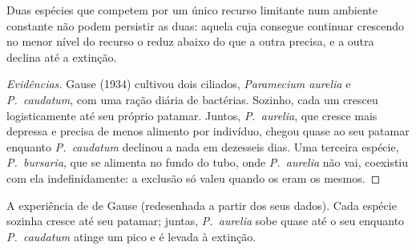 \begin{proposition}\label{prop:b1:species-interactions:gause}
Duas espécies que competem por um único recurso limitante num ambiente
constante não podem persistir as duas: aquela cuja  consegue
continuar crescendo no menor nível do recurso o reduz abaixo do que a
outra precisa, e a outra declina até a extinção.
\end{proposition}
\begin{proof}[Evidências]
Gause (1934) cultivou dois ciliados, \emph{Paramecium aurelia} e
\emph{P.~caudatum}, com uma ração diária de bactérias. Sozinho, cada
um cresceu logisticamente até seu próprio patamar. Juntos,
\emph{P.~aurelia}, que cresce mais depressa e precisa de menos
alimento por indivíduo, chegou quase ao seu patamar enquanto
\emph{P.~caudatum} declinou a nada em dezesseis dias. Uma terceira
espécie, \emph{P.~bursaria}, que se alimenta no fundo do tubo, onde
\emph{P.~aurelia} não vai, coexistiu com ela indefinidamente: a
exclusão só valeu quando os  eram os mesmos.
\end{proof}

\begin{omfigure}

{\small A experiência de  de Gause (redesenhada a partir dos
seus dados). Cada espécie sozinha cresce até seu patamar; juntas,
\emph{P.~aurelia} sobe quase até o seu enquanto \emph{P.~caudatum}
atinge um pico e é levada à extinção.}
\end{omfigure}

